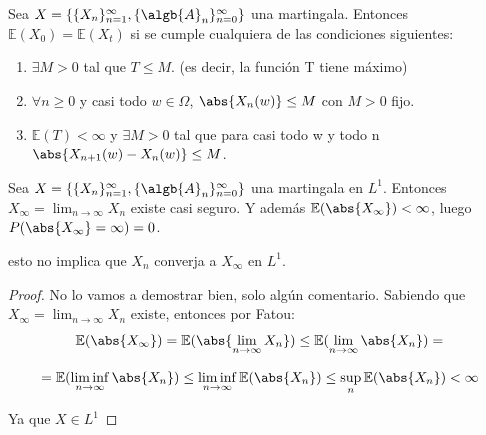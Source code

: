\documentclass{apuntes}
\begin{document}
\begin{theorem}

Sea $X=\{\{X_n\}_{n=1}^{\infty}, \{\algb{A}_n\}_{n=0}^{\infty}\}$ una martingala. Entonces $\mathbb{E}(X_0)=\mathbb{E}(X_t)$ si se cumple cualquiera de las condiciones siguientes:
\begin{enumerate}
\item $\exists M >0$ tal que $T \leq M$. (es decir, la función T tiene máximo)
\item $\forall n \geq 0$ y casi todo $w \in \Omega$, $\abs{X_n(w)} \leq M$ con $M >0$ fijo.
\item $\mathbb{E}(T)<\infty$ y $\exists M > 0$ tal que para casi todo w y todo n $\abs{X_{n+1}(w) - X_n(w)} \leq M$.
\end{enumerate}
\end{theorem}

\begin{theorem}

Sea $X=\{\{X_n\}_{n=1}^{\infty}, \{\algb{A}_n\}_{n=0}^{\infty}\}$ una martingala en $L^1$. Entonces $X_{\infty}=\lim_{n \rightarrow \infty} X_n$ existe casi seguro. Y además $\mathbb{E}(\abs{X_{\infty}})<\infty$, luego $P(\abs{X_{\infty}}=\infty)=0$.

\obs  esto no implica que $X_n$ converja a $X_{\infty}$ en $L^1$.

\end{theorem}


\begin{proof}
No lo vamos a demostrar bien, solo algún comentario. Sabiendo que $X_{\infty}=\lim_{n \rightarrow \infty} X_n$ existe, entonces por Fatou:
\[
\mathbb{E}(\abs{X_{\infty}}) = \mathbb{E}(\abs{\lim_{n \rightarrow \infty} X_n}) \leq \mathbb{E}(\lim_{n \rightarrow \infty} \abs{X_n}) =
\]

\[
= \mathbb{E}(\liminf_{n \rightarrow \infty} \abs{X_n}) \leq \liminf_{n \rightarrow \infty} \mathbb{E}(\abs{X_n}) \leq \sup_n \mathbb{E}(\abs{X_n}) <\infty
\]

Ya que $X \in L^1$

\end{proof}
\end{document}
